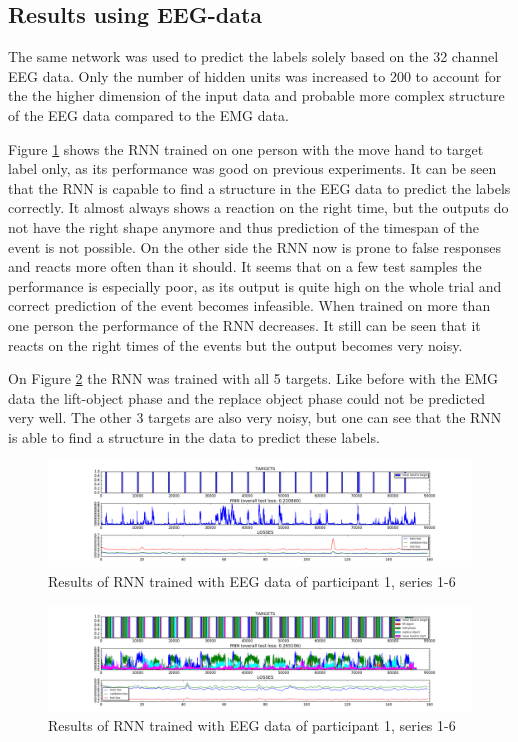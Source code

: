 \documentclass{article} %
\begin{document}
\subsection{Results using EEG-data}
The same network was used to predict the labels solely based on the 32 channel EEG data. Only the number of hidden units was increased to 200 to account for the the higher dimension of the input data and probable more complex structure of the EEG data compared to the EMG data.

Figure \ref{fig:eeg_RNN_1} shows the RNN trained on one person with the move hand to target label only, as its performance was good on previous experiments. It can be seen that the RNN is capable to find a structure in the EEG data to predict the labels correctly. It almost always shows a reaction on the right time, but the outputs do not have the right shape anymore and thus prediction of the timespan of the event is not possible. On the other side the RNN now is prone to false responses and reacts more often than it should. It seems that on a few test samples the performance is especially poor, as its output is quite high on the whole trial and correct prediction of the event becomes infeasible. When trained on more than one person the performance of the RNN decreases. It still can be seen that it reacts on the right times of the events but the output becomes very noisy.

On Figure \ref{fig:eeg_RNN_2} the RNN was trained with all 5 targets. Like before with the EMG data the lift-object phase and the replace object phase could not be predicted very well. The other 3 targets are also very noisy, but one can see that the RNN is able to find a structure in the data to predict these labels.

\begin{figure}
	\centering
	\includegraphics[trim=5.2cm 0.5cm 5cm 0.5cm, clip=true, width=1.0\textwidth]{images/EEG-results_participant_1_series_1-6_event_1.png}
	\caption{Results of RNN trained with EEG data of participant 1, series 1-6}
	\label{fig:eeg_RNN_1}
\end{figure}

\begin{figure}
	\centering
	\includegraphics[trim=5.2cm 0.5cm 5cm 0.5cm, clip=true, width=1.0\textwidth]{images/EEG-results_participant_1_series_1-6_event_1-5.png}
	\caption{Results of RNN trained with EEG data of participant 1, series 1-6}
	\label{fig:eeg_RNN_2}
\end{figure}
\end{document}
